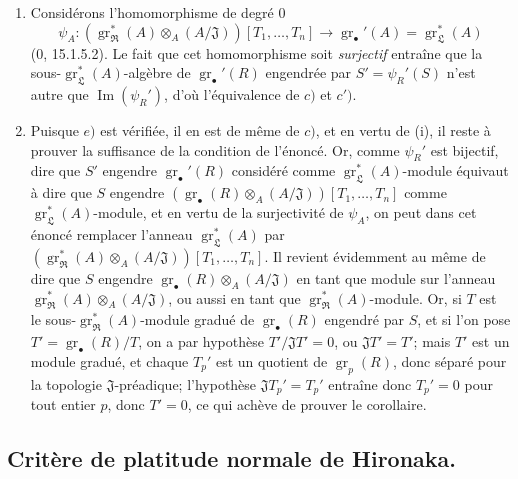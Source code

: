 \begin{enumerate}
  \item[(i)] Considérons l'homomorphisme de degré $0$
  \[
    \psi_A:(\operatorname{gr}_{\mathfrak R}^*(A)\otimes_A(A/\mathfrak J))[T_1,\ldots,T_n]\longrightarrow\operatorname{gr}_\bullet'(A)=\operatorname{gr}_{\mathfrak L}^*(A)
  \]
  ($0$, 15.1.5.2). Le fait que cet homomorphisme soit \emph{surjectif} entraîne que la sous-$\operatorname{gr}_{\mathfrak L}^*(A)$-algèbre de $\operatorname{gr}_\bullet'(R)$ engendrée par $S'=\psi_R'(S)$ n'est autre que $\operatorname{Im}(\psi_R')$, d'où l'équivalence de $c)$ et $c')$.
  \item[(ii)] Puisque $e)$ est vérifiée, il en est de même de $c)$, et en vertu de (i), il reste à prouver la suffisance de la condition de l'énoncé. Or, comme $\psi_R'$ est bijectif, dire que $S'$ engendre $\operatorname{gr}_\bullet'(R)$ considéré comme $\operatorname{gr}_{\mathfrak L}^*(A)$-module équivaut à dire que $S$ engendre $(\operatorname{gr}_\bullet(R)\otimes_A(A/\mathfrak J))[T_1,\ldots,T_n]$ comme $\operatorname{gr}_{\mathfrak L}^*(A)$-module, et en vertu de la surjectivité de $\psi_A$, on peut dans cet énoncé remplacer l'anneau $\operatorname{gr}_{\mathfrak L}^*(A)$ par $(\operatorname{gr}_{\mathfrak R}^*(A)\otimes_A(A/\mathfrak J))[T_1,\ldots,T_n]$. Il revient évidemment au même de dire que $S$ engendre $\operatorname{gr}_\bullet(R)\otimes_A(A/\mathfrak J)$ en tant que module sur l'anneau $\operatorname{gr}_{\mathfrak R}^*(A)\otimes_A(A/\mathfrak J)$, ou aussi en tant que $\operatorname{gr}_{\mathfrak R}^*(A)$-module. Or, si $T$ est le sous-$\operatorname{gr}_{\mathfrak R}^*(A)$-module gradué de $\operatorname{gr}_\bullet(R)$ engendré par $S$, et si l'on pose $T'=\operatorname{gr}_\bullet(R)/T$, on a par hypothèse $T'/\mathfrak JT'=0$, ou $\mathfrak JT'=T'$; mais $T'$ est un module gradué, et chaque $T_p'$ est un quotient de $\operatorname{gr}_p(R)$, donc séparé pour la topologie $\mathfrak J$-préadique; l'hypothèse $\mathfrak JT_p'=T_p'$ entraîne donc $T_p'=0$ pour tout entier $p$, donc $T'=0$, ce qui achève de prouver le corollaire.
\end{enumerate}

\subsection{Critère de platitude normale de Hironaka.}
\label{IV.19.7}

